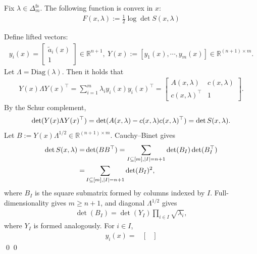 \documentclass[smallextended]{svjour3}
\let\springerproof\proof
\let\endspringerproof\endproof
\renewenvironment{proof}{\springerproof}{%
  \ifhmode\qed\else\leavevmode\qed\fi\endspringerproof}
\newcommand{\R}{\mathbb{R}}
\begin{document}
\begin{lemma}\label{lemma: convexity_of_F}
    Fix $\lambda \in \Delta_m^{\mathrm{fs}}$. The following function is convex in $x$:
    \begin{align*}
        F(x, \lambda):= \frac{1}{2}\log \det S(x, \lambda)
    \end{align*}
\end{lemma}
\begin{proof}
    Define lifted vectors:
    \begin{align*}
        y_i(x) = \begin{bmatrix}
            \tilde{a}_i(x)\\ 1
        \end{bmatrix} \in \R^{n+1},~
        Y(x):= [y_1(x),\cdots,y_m(x)] \in \R^{(n+1)\times m}.
    \end{align*}
    Let $\Lambda = \mathrm{Diag}(\lambda)$. Then it holds that
    \begin{align*}
        Y(x) \Lambda Y(x)^\top = \sum_{i=1}^m \lambda_i y_i(x)y_i(x)^\top =
        \begin{bmatrix}
            A(x, \lambda) & c(x, \lambda) \\
            c(x, \lambda)^\top & 1
        \end{bmatrix}.
    \end{align*}
    By the Schur complement,
    \begin{align}
        \det (Y(x) \Lambda Y(x)^\top) =
        \det(A(x, \lambda) - c(x, \lambda)c(x, \lambda)^\top) = \det S(x, \lambda). \notag
    \end{align}
    Let $B:=Y(x)\Lambda^{1/2}\in\R^{(n+1)\times m}$. Cauchy--Binet
    \cite[Section 0.8.7]{horn2012matrix} gives
    \begin{align}\label{eq: cauchy_binet_1}
         \det S(x,\lambda) = & \det (BB^\top) = \sum_{I\subseteq [m], |I|=n+1} \det(B_I) \det(B_I^\top) \notag \\
         = & \sum_{I\subseteq [m], |I|=n+1} \det(B_I)^2,
    \end{align}
    where $B_I$ is the square submatrix formed by columns indexed by $I$.
    Full-dimensionality gives $m\ge n+1$, and diagonal $\Lambda^{1/2}$ gives
    \begin{align}\label{eq: cauchy_binet_2}
        \det(B_I) = \det(Y_I) \prod_{i\in I}\sqrt{\lambda_i},
    \end{align}
    where $Y_I$ is formed analogously. For $i\in I$,
    \begin{align*}
        y_i(x) = & \begin{bmatrix}

\end{bmatrix}
\end{align*}
\end{proof}
\end{document}
